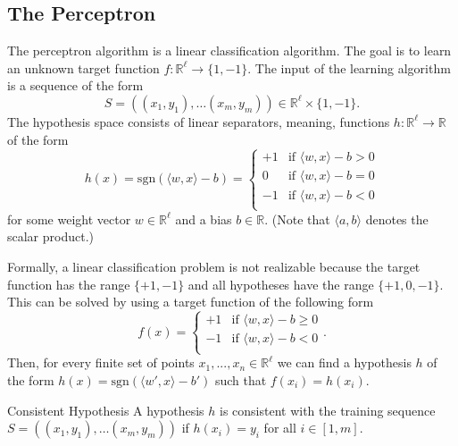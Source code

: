 \documentclass[english]{panikzettel}
\begin{document}



\subsection{The Perceptron}
The perceptron algorithm is a linear classification algorithm. The goal is to learn an unknown target function \mbox{$f:\mathbb{R}^\ell \rightarrow \{1,-1\}$.} The input of the learning algorithm is a sequence of the form
\[
S=((x_1,y_1),\ldots (x_m,y_m))\in\mathbb{R}^\ell\times\{1,-1\}.
\]
The hypothesis space consists of linear separators, meaning, functions $h:\mathbb{R}^\ell \rightarrow \mathbb{R}$ of the form
\[
h(x)=\text{sgn}(\langle w,x\rangle -b)=
\begin{cases}
+1 & \text{if } \langle w,x\rangle-b > 0  \\
0 & \text{if } \langle w,x\rangle-b = 0  \\
-1 & \text{if } \langle w,x\rangle-b < 0  \\
\end{cases}
\]
for some weight vector $w\in\mathbb{R}^\ell$ and a bias $b\in\mathbb{R}$. (Note that $\langle a,b\rangle$ denotes the scalar product.)

Formally, a linear classification problem is not realizable because the target function has the range $\{+1, -1\}$ and all hypotheses have the range $\{+1, 0, -1\}$. This can be solved by using a target function of the following form
\[
f(x)=
\begin{cases}
+1 & \text{if } \langle w,x\rangle-b \geq 0\\
-1 & \text{if } \langle w,x\rangle-b < 0\\
\end{cases}.
\]
Then, for every finite set of points $x_1,...,x_n\in\mathbb{R}^\ell$ we can find a hypothesis $h$ of the form $h(x)=\text{sgn}(\langle w',x\rangle-b')$ such that $f(x_i)=h(x_i)$.

\begin{defi}{Consistent Hypothesis}
A hypothesis $h$ is consistent with the training sequence $S=((x_1,y_1),\ldots (x_m,y_m))$ if $h(x_i)=y_i$ for all $i\in [1,m]$.
\end{defi}
\end{document}
